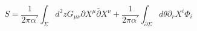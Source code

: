\begin{equation}
S=\frac{1}{2\pi\alpha^\prime}\int_\Sigma d^{2}z G_{\mu\nu}\partial
X^\mu\bar\partial
X^\nu+\frac{1}{2\pi\alpha^\prime}\int_{\partial\Sigma}d\theta\partial_r
X^i\Phi_i \label{sigmaGF}
\end{equation}

